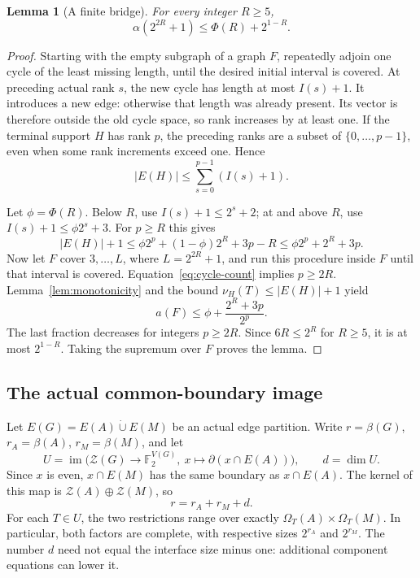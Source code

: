 \documentclass[11pt,a4paper]{article}
\numberwithin{equation}{section}
\newtheorem{lemma}[theorem]{Lemma}
\theoremstyle{definition}
\theoremstyle{remark}
\newcommand{\F}{\mathbb F_2}
\newcommand{\cZ}{\mathcal Z}
\newcommand{\Om}{\Omega}
\begin{document}
\begin{lemma}[A finite bridge]\label{lem:bridge}
For every integer $R\ge5$,
\begin{equation}\label{eq:bridge}
 \alpha(2^{2R}+1)\le\Phi(R)+2^{1-R}.
\end{equation}
\end{lemma}
\begin{proof}
Starting with the empty subgraph of a graph $F$, repeatedly adjoin one cycle of the least missing length, until the desired initial interval is covered. At preceding actual rank $s$, the new cycle has length at most $I(s)+1$. It introduces a new edge: otherwise that length was already present. Its vector is therefore outside the old cycle space, so rank increases by at least one. If the terminal support $H$ has rank $p$, the preceding ranks are a subset of $\{0,\ldots,p-1\}$, even when some rank increments exceed one. Hence
\begin{equation}\label{eq:greedy}
 |E(H)|\le\sum_{s=0}^{p-1}(I(s)+1).
\end{equation}

Let $\phi=\Phi(R)$. Below $R$, use $I(s)+1\le2^s+2$; at and above $R$, use $I(s)+1\le\phi2^s+3$. For $p\ge R$ this gives
\[
 |E(H)|+1\le\phi2^p+(1-\phi)2^R+3p-R
                  \le\phi2^p+2^R+3p.
\]
Now let $F$ cover $3,\ldots,L$, where $L=2^{2R}+1$, and run this procedure inside $F$ until that interval is covered. Equation~\eqref{eq:cycle-count} implies $p\ge2R$. Lemma~\ref{lem:monotonicity} and the bound $\nu_H(T)\le|E(H)|+1$ yield
\[
 a(F)\le\phi+\frac{2^R+3p}{2^p}.
\]
The last fraction decreases for integers $p\ge2R$. Since $6R\le2^R$ for $R\ge5$, it is at most $2^{1-R}$. Taking the supremum over $F$ proves the lemma.
\end{proof}

\subsection{The actual common-boundary image}
Let $E(G)=E(A)\mathbin{\dot\cup}E(M)$ be an actual edge partition. Write $r=\beta(G)$, $r_A=\beta(A)$, $r_M=\beta(M)$, and let
\[
 U=\operatorname{im}\bigl(\cZ(G)\longrightarrow\F^{V(G)},\ 
                       x\longmapsto\partial(x\cap E(A))\bigr),
 \qquad d=\dim U.
\]
Since $x$ is even, $x\cap E(M)$ has the same boundary as $x\cap E(A)$. The kernel of this map is $\cZ(A)\oplus\cZ(M)$, so
\begin{equation}\label{eq:actual-rank}
 r=r_A+r_M+d.
\end{equation}
For each $T\in U$, the two restrictions range over exactly
$\Om_T(A)\times\Om_T(M)$. In particular, both factors are complete, with respective sizes $2^{r_A}$ and $2^{r_M}$. The number $d$ need not equal the interface size minus one: additional component equations can lower it.
\end{document}
